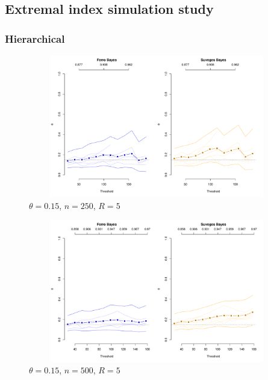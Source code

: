 \documentclass[12pt]{article}
\begin{document}
\subsection*{Extremal index simulation study}

\subsubsection*{Hierarchical}

\newpage

\begin{figure}
\begin{center}
\includegraphics[width=5.5in, height=2.45in]{../extremal_comparison/figs/sim_frechet_hier_15_250_5.pdf}
\caption{$\theta=0.15$, $n=250$, $R=5$}
\end{center}
\end{figure}

\begin{figure}
\begin{center}
\includegraphics[width=5.5in, height=2.45in]{../extremal_comparison/figs/sim_frechet_hier_15_500_5.pdf}
\caption{$\theta=0.15$, $n=500$, $R=5$}
\end{center}
\end{figure}
\end{document}
